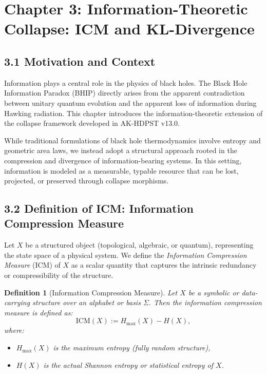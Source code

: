 \documentclass[11pt]{article}
\newtheorem{definition}[theorem]{Definition}
\begin{document}
\section{Chapter 3: Information-Theoretic Collapse: ICM and KL-Divergence}

\subsection*{3.1 Motivation and Context}

Information plays a central role in the physics of black holes. The Black Hole Information Paradox (BHIP) directly arises from the apparent contradiction between unitary quantum evolution and the apparent loss of information during Hawking radiation. This chapter introduces the information-theoretic extension of the collapse framework developed in AK-HDPST v13.0.

While traditional formulations of black hole thermodynamics involve entropy and geometric area laws, we instead adopt a structural approach rooted in the compression and divergence of information-bearing systems. In this setting, information is modeled as a measurable, typable resource that can be lost, projected, or preserved through collapse morphisms.

\subsection*{3.2 Definition of ICM: Information Compression Measure}

Let \( X \) be a structured object (topological, algebraic, or quantum), representing the state space of a physical system. We define the \textit{Information Compression Measure} (ICM) of \( X \) as a scalar quantity that captures the intrinsic redundancy or compressibility of the structure.

\begin{definition}[Information Compression Measure]
Let \( X \) be a symbolic or data-carrying structure over an alphabet or basis \( \Sigma \). Then the information compression measure is defined as:
\[
\mathrm{ICM}(X) := H_{\max}(X) - H(X),
\]
where:
\begin{itemize}
    \item \( H_{\max}(X) \) is the maximum entropy (fully random structure),
    \item \( H(X) \) is the actual Shannon entropy or statistical entropy of \( X \).
\end{itemize}
\end{definition}
\end{document}
